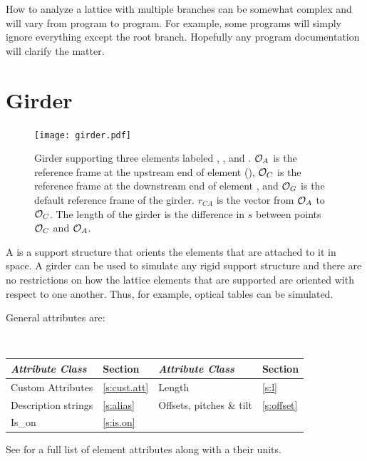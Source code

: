 How to analyze a lattice with multiple branches can be somewhat complex and will vary from program
to program. For example, some programs will simply ignore everything except the root branch. Hopefully
any program documentation will clarify the matter.

\newpage

\section{Girder}
\label{s:girder}

\begin{figure}[t]
  \centering
  \texttt{[image: girder.pdf]}
  \caption[Girder example.] {
Girder supporting three elements labeled , , and .  ${\cal O}_A$ is the reference
frame at the upstream end of element  (), ${\cal O}_C$ is the reference
frame at the downstream end of element , and ${\cal O}_G$ is the default  reference
frame of the girder. $r_{CA}$ is the vector from ${\cal O}_A$ to ${\cal O}_C$. The length  of the
girder is the difference in $s$ between points ${\cal O}_C$ and ${\cal O}_A$.
  }
  \label{f:girder}
\end{figure}

A  is a support structure that orients the elements that are attached to it in space. A
girder can be used to simulate any rigid support structure and there are no restrictions on how the
lattice elements that are supported are oriented with respect to one another.  Thus, for example,
optical tables can be simulated.

General  attributes are:
\begin{center}
\tt
\begin{tabular}{llll} \toprule
  {\sl Attribute Class}      & Section           & {\sl Attribute Class}      & Section         \\ \midrule
  Custom Attributes          & \ref{s:cust.att}  & Length                     & \ref{s:l}       \\
  Description strings        & \ref{s:alias}     & Offsets, pitches \& tilt   & \ref{s:offset}  \\ 
  Is_on                      & \ref{s:is.on}     &                            &                 \\
  \bottomrule
\end{tabular}
\end{center}
\toffset
See  for a full list of element attributes along with a their units.

